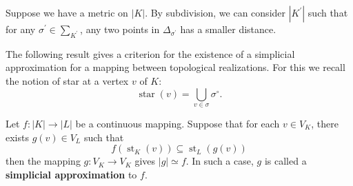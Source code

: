 \begin{remark} Suppose we have a metric on \(\left| K\right|\). By subdivision, we can consider \(\left| {K}^{\prime }\right|\) such that for any \({\sigma }^{\prime } \in  {\sum }_{{K}^{\prime }}\), any two points in \({\Delta }_{{\sigma }^{\prime }}\) has a smaller distance.
\end{remark}

The following result gives a criterion for the existence of a simplicial approximation for a mapping between topological realizations. For this we recall the notion of star at a vertex \(v\) of $K$:
\[
\operatorname{star}\left( v\right)  = \mathop{\bigcup }\limits_{{v \in  \sigma }}{\sigma }^{ \circ  }.
\]

\begin{proposition} \label{prop:simplicial_approx} Let \(f : \left| K\right|  \rightarrow  \left| L\right|\) be a continuous mapping. Suppose that for each \(v \in  {V}_{K}\), there exists \(g\left( v\right)  \in  {V}_{L}\) such that
\[
f\left( {{\operatorname{st}}_{K}\left( v\right) }\right)  \subseteq  {\operatorname{st}}_{L}\left( {g\left( v\right) }\right)
\]
then the mapping \(g : {V}_{K} \rightarrow  {V}_{K}\) gives \(\left| g\right|  \simeq  f\). In such a case, \(g\) is called a {\bf simplicial approximation} to \(f\).
\end{proposition}

